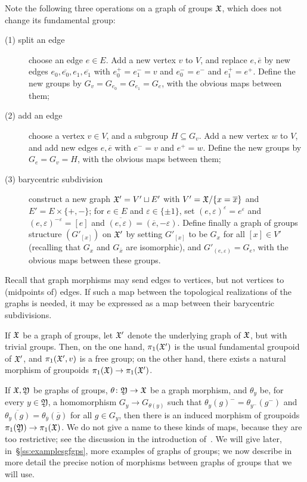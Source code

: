 \documentclass{amsart}
\begin{document}
Note the following three operations on a graph of groups ${\mathfrak X}$, which
does not change its fundamental group:
\begin{description}
\item[(1) split an edge] choose an edge $e\in E$. Add a new vertex $v$
  to $V$, and replace $e,\overline e$ by new edges
  $e_0,\overline{e_0},e_1,\overline{e_1}$ with $e_0^+=e_1^-=v$ and
  $e_0^-=e^-$ and $e_1^+=e^+$. Define the new groups by
  $G_v=G_{e_0}=G_{e_1}=G_e$, with the obvious maps between them;
\item[(2) add an edge] choose a vertex $v\in V$, and a subgroup
  $H\subseteq G_v$. Add a new vertex $w$ to $V$, and add new edges
  $e,\overline e$ with $e^-=v$ and $e^+=w$. Define the new groups by
  $G_e=G_v=H$, with the obvious maps between them;
\item[(3) barycentric subdivision] construct a new graph ${\mathfrak X}'=V'\sqcup E'$
  with $V'={\mathfrak X}/\{x=\overline x\}$ and $E'=E\times\{+,-\}$; for $e\in E$ and
  $\varepsilon\in\{\pm1\}$, set $(e,\varepsilon)^\varepsilon=e^\varepsilon$
  and $(e,\varepsilon)^{-\varepsilon}=[e]$ and
  $\overline{(e,\varepsilon)}=(\overline e,-\varepsilon)$. Define finally a
  graph of groups structure $(G'_{[x]})$ on ${\mathfrak X}'$ by setting $G'_{[x]}$ to
  be $G_x$ for all $[x]\in V'$ (recalling that $G_x$ and $G_{\bar x}$ are
  isomorphic), and $G'_{(e,\varepsilon)}=G_e$, with the obvious maps
  between these groups.
\end{description}

Recall that graph morphisms may send edges to vertices, but not vertices to
(midpoints of) edges. If such a map between the topological realizations of
the graphs is needed, it may be expressed as a map between their
barycentric subdivisions.

If ${\mathfrak X}$ be a graph of groups, let ${\mathfrak X}'$ denote the underlying graph
of ${\mathfrak X}$, but with trivial groups. Then, on the one hand,
$\pi_1({\mathfrak X}')$ is the usual fundamental groupoid of ${\mathfrak X}'$, and
$\pi_1({\mathfrak X}',v)$ is a free group; on the other hand, there exists a
natural morphism of groupoids $\pi_1({\mathfrak X})\to\pi_1({\mathfrak X}')$.

If ${\mathfrak X},\mathfrak Y$ be graphs of groups, $\theta\colon\mathfrak Y\to{\mathfrak X}$ be a
graph morphism, and $\theta_y$ be, for every $y\in\mathfrak Y$, a
homomorphism $G_y\to G_{\theta(y)}$ such that
$\theta_y(g)^-=\theta_{y^-}(g^-)$ and
$\overline{\theta_y(g)}=\theta_{\overline y}(\overline g)$ for all $g\in
G_y$, then there is an induced morphism of groupoids $\pi_1(\mathfrak
Y)\to\pi_1({\mathfrak X})$.  We do not give a name to these kinds of maps, because
they are too restrictive; see the discussion in the introduction
of~\cite{bass:covering}.  We will give later, in~\S\ref{ss:examplesgfgps},
more examples of graphs of groups; we now describe in more detail the
precise notion of morphisms between graphs of groups that we will use.
\end{document}
